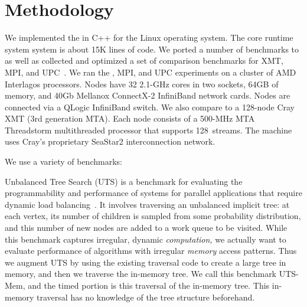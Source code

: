 \section{Methodology} \label{sec:method}

We implemented the \Grappa in C++ for the Linux operating system. The core
runtime system system is about 15K lines of code. We ported a number of
benchmarks to \Grappa as well as collected and optimized a set of comparison
benchmarks for XMT, MPI, and UPC~\cite{UPC}. We ran the \Grappa, MPI, and UPC
experiments on a cluster of AMD Interlagos processors. Nodes have 32 2.1-GHz
cores in two sockets, 64GB of memory, and 40Gb Mellanox ConnectX-2 InfiniBand
network cards. Nodes are connected via a QLogic InfiniBand switch. We also
compare \Grappa to a 128-node Cray XMT (3rd generation MTA). Each node
consists of a 500-MHz MTA Threadstorm multithreaded processor that supports
128~streams. The machine uses Cray's proprietary SeaStar2 interconnection
network. 

We use a variety of benchmarks:

% 

\vspace{0.5ex}
 Unbalanced Tree Search
(UTS) is a benchmark for evaluating the programmability and performance of
systems for parallel applications that require dynamic load
balancing~\cite{UTS}. It involves traversing an unbalanced implicit tree: at
each vertex, its number of children is sampled from some probability
distribution, and this number of new nodes are added to a work queue to be
visited. While this benchmark captures irregular, dynamic \emph{computation,}
we actually want to evaluate performance of algorithms with irregular
\emph{memory\/} access patterns. Thus we augment UTS by using the existing
traversal code to create a large tree in memory, and then we traverse the
in-memory tree. We call this benchmark UTS-Mem, and the timed portion is this
traversal of the in-memory tree. This in-memory traversal has no knowledge of
the tree structure beforehand.

